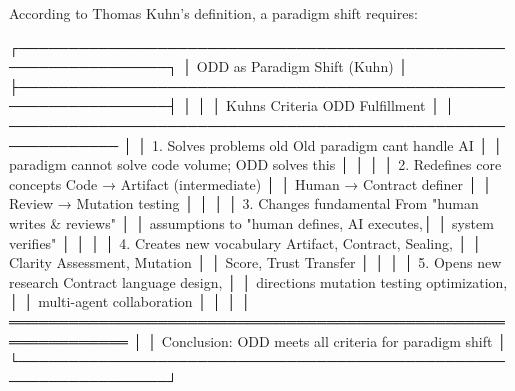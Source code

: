 \documentclass[
]{article}
\newenvironment{Shaded}{}{}
\newcommand{\NormalTok}[1]{#1}
\begin{document}
According to Thomas Kuhn's definition, a paradigm shift requires:

\begin{Shaded}
\begin{Highlighting}[]
\NormalTok{┌─────────────────────────────────────────────────────────────────┐}
\NormalTok{│                  ODD as Paradigm Shift (Kuhn)                    │}
\NormalTok{├─────────────────────────────────────────────────────────────────┤}
\NormalTok{│                                                                  │}
\NormalTok{│  Kuhn\textquotesingle{}s Criteria                 ODD Fulfillment                │}
\NormalTok{│  ─────────────────────────────────────────────────────────────  │}
\NormalTok{│  1. Solves problems old          Old paradigm can\textquotesingle{}t handle AI   │}
\NormalTok{│     paradigm cannot solve        code volume; ODD solves this   │}
\NormalTok{│                                                                  │}
\NormalTok{│  2. Redefines core concepts      Code → Artifact (intermediate) │}
\NormalTok{│                                  Human → Contract definer       │}
\NormalTok{│                                  Review → Mutation testing      │}
\NormalTok{│                                                                  │}
\NormalTok{│  3. Changes fundamental          From "human writes \& reviews"  │}
\NormalTok{│     assumptions                  to "human defines, AI executes,│}
\NormalTok{│                                  system verifies"               │}
\NormalTok{│                                                                  │}
\NormalTok{│  4. Creates new vocabulary       Artifact, Contract, Sealing,   │}
\NormalTok{│                                  Clarity Assessment, Mutation   │}
\NormalTok{│                                  Score, Trust Transfer          │}
\NormalTok{│                                                                  │}
\NormalTok{│  5. Opens new research           Contract language design,      │}
\NormalTok{│     directions                   mutation testing optimization, │}
\NormalTok{│                                  multi{-}agent collaboration      │}
\NormalTok{│                                                                  │}
\NormalTok{│  ══════════════════════════════════════════════════════════════  │}
\NormalTok{│  Conclusion: ODD meets all criteria for paradigm shift          │}
\NormalTok{└─────────────────────────────────────────────────────────────────┘}
\end{Highlighting}
\end{Shaded}
\end{document}
